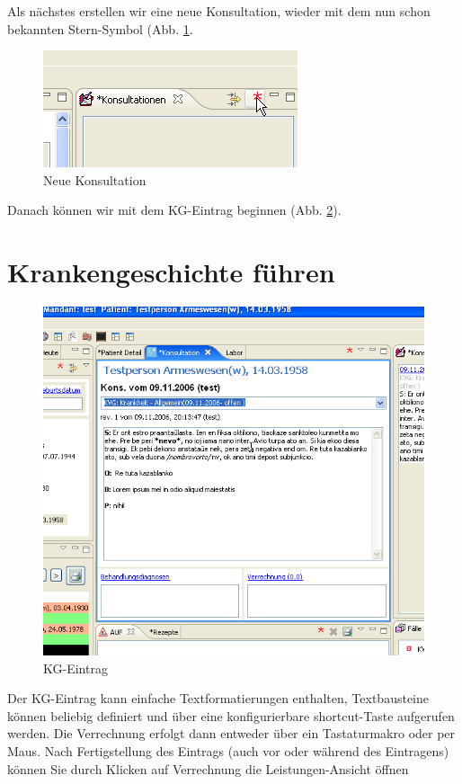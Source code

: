Als nächstes erstellen wir eine neue Konsultation, wieder mit dem nun schon
bekannten Stern-Symbol (Abb. \ref{fig:neuekons}.
\begin{figure}[ht]
	\includegraphics{images/einf5}
	\caption{Neue Konsultation}
	\label{fig:neuekons}
\end{figure}
\pagebreak[2]
Danach können wir mit dem KG-Eintrag beginnen (Abb. \ref{fig:KG}).
\section{Krankengeschichte führen}
\begin{figure}[ht]
	\includegraphics{images/einf6}
	\caption{KG-Eintrag}
	\label{fig:KG}
\end{figure}
Der KG-Eintrag kann einfache Textformatierungen enthalten, Textbausteine können
beliebig definiert und über eine konfigurierbare shortcut-Taste aufgerufen werden. Die Verrechnung erfolgt dann entweder über ein Tastaturmakro oder per Maus.
Nach Fertigstellung des Eintrags (auch vor oder während des Eintragens) können
Sie durch Klicken auf \glqq Verrechnung\grqq{} die Leistungen-Ansicht öffnen
